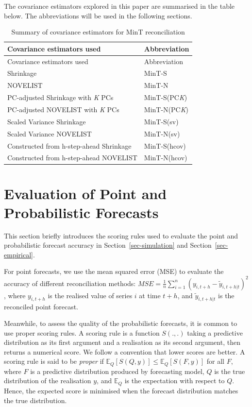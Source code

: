 \documentclass[
  11pt,
  letterpaper,
  DIV=11,
  numbers=noendperiod,
  titlepage]{scrartcl}
\begin{document}
The covariance estimators explored in this paper are summarised in the
table below. The abbreviations will be used in the following sections.

\begin{longtable}[]{@{}ll@{}}
\caption{Summary of covariance estimators for MinT
reconciliation}\label{tbl-cov}\tabularnewline
\toprule\noalign{}
Covariance estimators used & Abbreviation \\
\midrule\noalign{}
\endfirsthead
\toprule\noalign{}
Covariance estimators used & Abbreviation \\
\midrule\noalign{}
\endhead
\bottomrule\noalign{}
\endlastfoot
Shrinkage & MinT-S \\
NOVELIST & MinT-N \\
PC-adjusted Shrinkage with \emph{K} PCs & MinT-S(PC\emph{K}) \\
PC-adjusted NOVELIST with \emph{K} PCs & MinT-N(PC\emph{K}) \\
Scaled Variance Shrinkage & MinT-S(sv) \\
Scaled Variance NOVELIST & MinT-N(sv) \\
Constructed from h-step-ahead Shrinkage & MinT-S(hcov) \\
Constructed from h-step-ahead NOVELIST & MinT-N(hcov) \\
\end{longtable}

\section{Evaluation of Point and Probabilistic
Forecasts}\label{sec-scores}

This section briefly introduces the scoring rules used to evaluate the
point and probabilistic forecast accuracy in
Section~\ref{sec-simulation} and Section~\ref{sec-empirical}.

For point forecasts, we use the mean squared error (MSE) to evaluate the
accuracy of different reconciliation methods:
\(MSE = \frac{1}{n} \sum_{i=1}^n (y_{i, t+h} - \tilde{y}_{i,t+h|t})^2\),
where \(y_{i, t+h}\) is the realised value of series \(i\) at time
\(t+h\), and \(\tilde{y}_{i,t+h|t}\) is the reconciled point forecast.

Meanwhile, to assess the quality of the probabilistic forecasts, it is
common to use proper scoring rules. A scoring rule is a function
\(S(., .)\) taking a predictive distribution as its first argument and a
realisation as its second argument, then returns a numerical score. We
follow a convention that lower scores are better. A scoring rule is said
to be \emph{proper} if
\(\mathbb{E}_Q[S(Q, y)] \leq \mathbb{E}_Q[S(F, y)]\) for all \(F\),
where \(F\) is a predictive distribution produced by forecasting model,
\(Q\) is the true distribution of the realisation \(y\), and
\(\mathbb{E}_Q\) is the expectation with respect to \(Q\). Hence, the
expected score is minimised when the forecast distribution matches the
true distribution.
\end{document}
